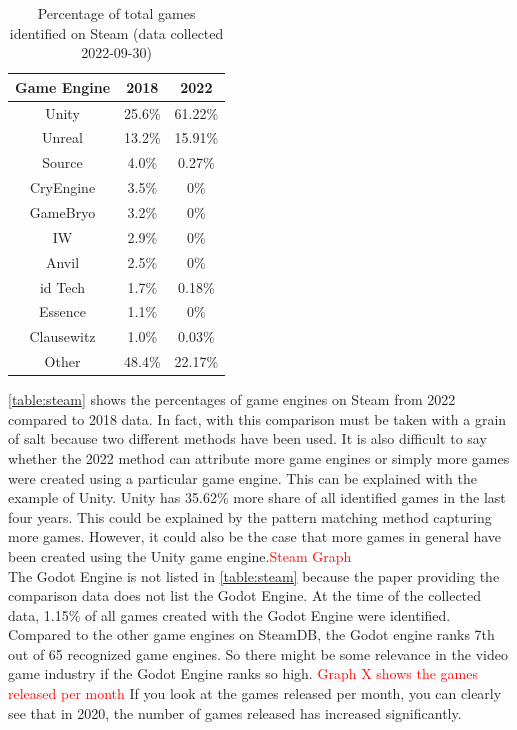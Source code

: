 \begin{table}[h!]
    \centering
    \begin{tabular}{|c c c|}
        \hline
        Game Engine & 2018   & 2022    \\
        \hline\hline
        Unity       & 25.6\% & 61.22\% \\
        Unreal      & 13.2\% & 15.91\% \\
        Source      & 4.0\%  & 0.27\%  \\
        CryEngine   & 3.5\%  & 0\%     \\
        GameBryo    & 3.2\%  & 0\%     \\
        IW          & 2.9\%  & 0\%     \\
        Anvil       & 2.5\%  & 0\%     \\
        id Tech     & 1.7\%  & 0.18\%  \\
        Essence     & 1.1\%  & 0\%     \\
        Clausewitz  & 1.0\%  & 0.03\%  \\
        Other       & 48.4\% & 22.17\% \\
        \hline
    \end{tabular}
    \caption{Percentage of total games identified on Steam (data collected 2022-09-30)}
    \label{table:steam}
\end{table}

\autoref{table:steam} shows the percentages of game engines on Steam from 2022 compared to 2018 data.
In fact, with this comparison must be taken with a grain of salt because two different methods have been used.
It is also difficult to say whether the 2022 method can attribute more game engines or simply more games were created using a particular game engine.
This can be explained with the example of Unity.
Unity has 35.62\% more share of all identified games in the last four years.
This could be explained by the pattern matching method capturing more games.
However, it could also be the case that more games in general have been created using the Unity game engine.\textcolor{red}{Steam Graph} \\


The Godot Engine is not listed in \autoref{table:steam} because the paper providing the comparison data does not list the Godot Engine.
At the time of the collected data, 1.15\% of all games created with the Godot Engine were identified.
Compared to the other game engines on SteamDB, the Godot engine ranks 7th out of 65 recognized game engines.
So there might be some relevance in the video game industry if the Godot Engine ranks so high.
\textcolor{red}{Graph X shows the games released per month}
If you look at the games released per month, you can clearly see that in 2020, the number of games released has increased significantly.\\

